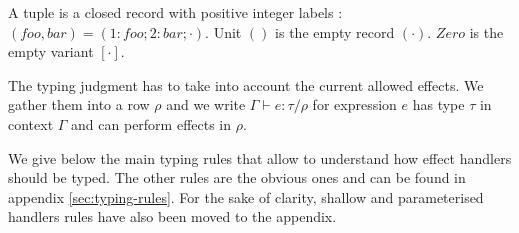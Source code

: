 \documentclass[11pt, nonacm=true, language=french, language=english]{acmart}
\begin{document}
\begin{rem}
  A tuple is a closed record with positive integer labels : $(foo, bar) = (1:foo; 2:bar; \cdot)$. Unit $()$ is the empty record $(\cdot)$. $Zero$ is the empty variant $[\cdot]$.
\end{rem}


The typing judgment has to take into account the current allowed effects. We gather them into a row $\rho$ and we write $\Gamma \vdash e : \tau / \rho$ for expression $e$ has type $\tau$ in context $\Gamma$ and can perform effects in $\rho$.

We give below the main typing rules that allow to understand how effect handlers should be typed. The other rules are the obvious ones and can be found in appendix \ref{sec:typing-rules}. For the sake of clarity, shallow and parameterised handlers rules have also been moved to the appendix.

\begin{prooftree}
\end{prooftree}

\begin{prooftree}
\end{prooftree}

\begin{prooftree}
\end{prooftree}

\begin{prooftree}
\end{prooftree}


\begin{prooftree}
\end{prooftree}
\end{document}
